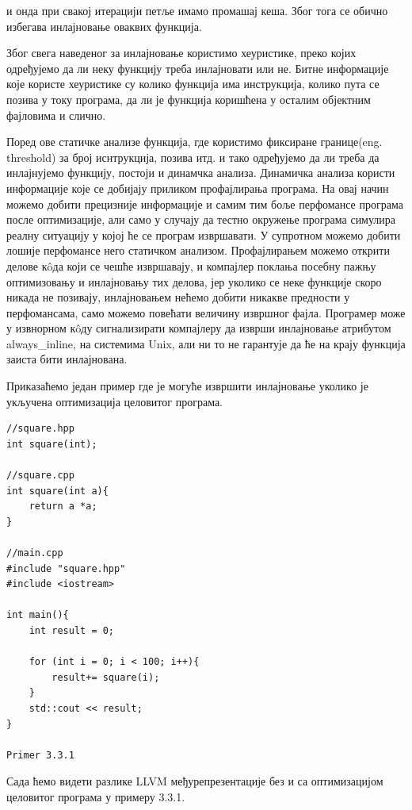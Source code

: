 \documentclass[12pt,oneside]{memoir}
\begin{document}
и онда при свакој итерацији петље имамо промашај кеша. Због тога се
обично избегава инлајновање оваквих функција.
\par
Због свега наведеног за инлајновање користимо хеуристике, преко којих одређујемо
да ли неку функцију треба инлајновати или не.
Битне информације које користе хеуристике су колико функција има инструкција,
колико пута се позива у току програма, да ли је функција коришћена у осталим
објектним фајловима и слично.
\par
Поред ове статичке анализе функција, где користимо фиксиране границе(eng. threshold)
за број иснтрукција, позива итд. и тако одређујемо да ли треба да инлајнујемо функцију,
постоји и динамчка анализа.
Динамичка анализа користи информације које се добијају приликом профајлирања програма.
На овај начин можемо добити прецизније информације и самим тим боље перфомансе програма после оптимизације,
али само у случају да тестно окружење програма симулира реалну ситуацију у којој
ће се програм извршавати.
У супротном можемо добити лошије перфомансе него статичком анализом.
Профајлирањем можемо открити делове к\^{o}да који се чешће извршавају, и компајлер 
поклања посебну пажњу оптимизовању и инлајновању тих делова, јер уколико се неке
функције скоро никада не позивају, инлајновањем нећемо добити никакве предности
у перфомансама, само можемо повећати величину извршног фајла.	
Програмер може у извнорном  к\^{o}ду сигнализирати компајлеру да изврши инлајновање
атрибутом always{\_}inline, на системима Unix, али ни то не гарантује да ће на крају
функција заиста бити инлајнована.
\par
Приказаћемо један пример где је могуће извршити инлајновање уколико
је укључена оптимизација целовитог програма.

\begin{lstlisting}[frame=single]
//square.hpp           
int square(int);         
    					
//square.cpp				
int square(int a){
    return a *a;
}

//main.cpp
#include "square.hpp"
#include <iostream>

int main(){
    int result = 0;
    
    for (int i = 0; i < 100; i++){
        result+= square(i);
    }
    std::cout << result;
}

Primer 3.3.1
\end{lstlisting}

Сада ћемо видети разлике LLVM међурепрезентације без и са оптимизацијом
целовитог програма у примеру 3.3.1.
\end{document}
